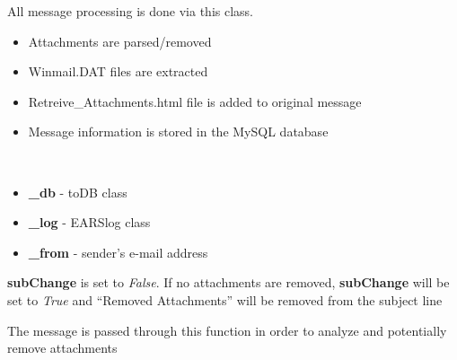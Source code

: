 \documentclass[letterpaper,10pt,english]{sphinxmanual}
\begin{document}
\begin{fulllineitems}
\label{codedocs/EARSmilter:EARSmilter.EARSmilter.ProcessMessage}
All message processing is done via this class.
\begin{itemize}
\item {} 
Attachments are parsed/removed

\item {} 
Winmail.DAT files are extracted

\item {} 
Retreive\_Attachments.html file is added to original message

\item {} 
Message information is stored in the MySQL database

\end{itemize}

\begin{fulllineitems}
\label{codedocs/EARSmilter:EARSmilter.EARSmilter.ProcessMessage.__init__}~\begin{itemize}
\item {} 
\textbf{\_db} - toDB class

\item {} 
\textbf{\_log} - EARSlog class

\item {} 
\textbf{\_from} - sender's e-mail address

\end{itemize}

\textbf{subChange} is set to \emph{False}.  If no attachments are removed, \textbf{subChange}
will be set to \emph{True} and ``Removed Attachments'' will be removed from the subject line

\end{fulllineitems}


\begin{fulllineitems}
\label{codedocs/EARSmilter:EARSmilter.EARSmilter.ProcessMessage.ParseAttachments}
The message is passed through this function in order to analyze and potentially remove attachments


\end{fulllineitems}
\end{fulllineitems}
\end{document}
